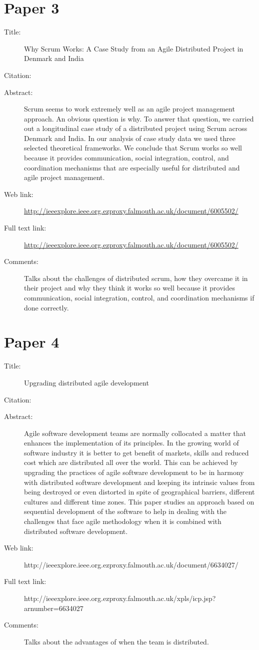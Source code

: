 \documentclass{scrartcl}
\begin{document}
\section*{Paper 3}
\begin{description}
\item[Title:] Why Scrum Works: A Case Study from an Agile Distributed Project in Denmark and India
\item[Citation:] \cite{6005502}
\item[Abstract:] Scrum seems to work extremely well as an agile project management approach. An obvious question is why. To answer that question, we carried out a longitudinal case study of a distributed project using Scrum across Denmark and India. In our analysis of case study data we used three selected theoretical frameworks. We conclude that Scrum works so well because it provides communication, social integration, control, and coordination mechanisms that are especially useful for distributed and agile project management.
\item[Web link:] \url{http://ieeexplore.ieee.org.ezproxy.falmouth.ac.uk/document/6005502/}
\item[Full text link:] \url{http://ieeexplore.ieee.org.ezproxy.falmouth.ac.uk/document/6005502/}
\item[Comments:] Talks about the challenges of distributed scrum, how they overcame it in their project and why they think it works so well because it provides communication, social integration, control, and coordination mechanisms if done correctly.
\end{description}

\section*{Paper 4}
\begin{description}
\item[Title:] Upgrading distributed agile development
\item[Citation:] \cite{6634027}
\item[Abstract:] Agile software development teams are normally collocated a matter that enhances the implementation of its principles. In the growing world of software industry it is better to get benefit of markets, skills and reduced cost which are distributed all over the world. This can be achieved by upgrading the practices of agile software development to be in harmony with distributed software development and keeping its intrinsic values from being destroyed or even distorted in spite of geographical barriers, different cultures and different time zones. This paper studies an approach based on sequential development of the software to help in dealing with the challenges that face agile methodology when it is combined with distributed software development.
\item[Web link:] http://ieeexplore.ieee.org.ezproxy.falmouth.ac.uk/document/6634027/
\item[Full text link:] http://ieeexplore.ieee.org.ezproxy.falmouth.ac.uk/xpls/icp.jsp?arnumber=6634027
\item[Comments:] Talks about the advantages of when the team is distributed. 
\end{description}
\end{document}
